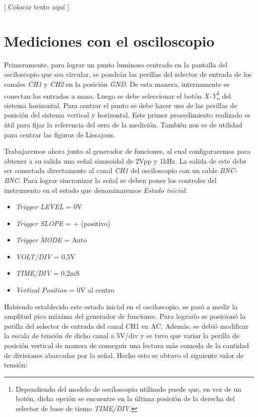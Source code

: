 \documentclass{article}
\begin{document}
	[ Colocar texto aquí ]




\section{Mediciones con el osciloscopio}

	Primeramente, para lograr un punto luminoso centrado en la pantalla del osciloscopio que sea circular, se pondrán las perillas del selector de entrada de los canales \textit{CH1} y \textit{CH2} en la posición \textit{GND}. De esta manera, internamente se conectan las entradas a masa. Luego se debe seleccionar el botón \textit{X-Y}\footnote{Dependiendo del modelo de osciloscopio utilizado puede que, en vez de un botón, dicha opción se encuentre en la última posición de la derecha del selector de base de tiemo \textit{TIME/DIV}.} del sistema horizontal. Para centrar el punto se debe hacer uso de las perillas de posición del sistema vertical y horizontal.	Este primer procedimiento realizado es útil para fijar la referencia del cero de la medición. También nos es de utilidad para centrar las figuras de Lissajous.
	\par
	Trabajaremos ahora junto al generador de funciones, al cual configuraremos para obtener a su salida una señal sinusoidal de 2Vpp y 1kHz. La salida de este debe ser conectada directamente al canal \textit{CH1} del osciloscopio con un cable \textit{BNC-BNC}. Para lograr sincronizar la señal se deben poner los controles del instrumento en el estado que denominaremos \textit{Estado inicial}:
\medskip


\begin{itemize}
\itemsep=2pt \topsep=0pt \partopsep=0pt \parskip=0pt \parsep=0pt
	\item \textit{Trigger LEVEL} = 0V
	\item \textit{Trigger SLOPE} = + (positivo)
	\item \textit{Trigger MODE} = Auto
	\item \textit{VOLT/DIV} = 0,5V
	\item \textit{TIME/DIV} = 0,2mS
	\item \textit{Vertical Position} = 0V al centro
\end{itemize}
\medskip


	Habiendo establecido este estado inicial en el osciloscopio, se pasó a medir la amplitud pico máxima del generador de funciones. Para lograrlo se posicionó la perilla del selector de entrada del canal CH1 en AC. Además, se debió modificar la escala de tensión de dicho canal a 5V/div y se tuvo que variar la perilla de posición vertical de manera de conseguir una lectura más comoda de la cantidad de divisiones abarcadas por la señal. Hecho esto se obtuvo el siguiente valor de tensión:
\end{document}
